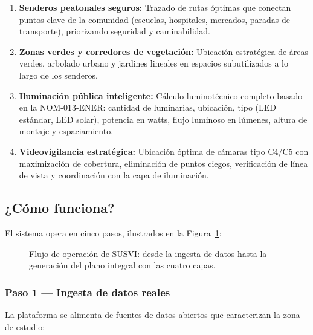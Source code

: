 \documentclass[12pt,a4paper]{article}
\begin{document}
\begin{enumerate}[label=\textbf{\arabic*.}]
    \item \textbf{Senderos peatonales seguros:} Trazado de rutas óptimas que conectan puntos clave de la comunidad (escuelas, hospitales, mercados, paradas de transporte), priorizando seguridad y caminabilidad.
    
    \item \textbf{Zonas verdes y corredores de vegetación:} Ubicación estratégica de áreas verdes, arbolado urbano y jardines lineales en espacios subutilizados a lo largo de los senderos.
    
    \item \textbf{Iluminación pública inteligente:} Cálculo luminotécnico completo basado en la NOM-013-ENER: cantidad de luminarias, ubicación, tipo (LED estándar, LED solar), potencia en watts, flujo luminoso en lúmenes, altura de montaje y espaciamiento.
    
    \item \textbf{Videovigilancia estratégica:} Ubicación óptima de cámaras tipo C4/C5 con maximización de cobertura, eliminación de puntos ciegos, verificación de línea de vista y coordinación con la capa de iluminación.
\end{enumerate}


\subsection{¿Cómo funciona?}

El sistema opera en cinco pasos, ilustrados en la Figura~\ref{fig:flujo}:

\begin{figure}[H]
\centering

\caption{Flujo de operación de SUSVI: desde la ingesta de datos hasta la generación del plano integral con las cuatro capas.}
\label{fig:flujo}
\end{figure}
\subsubsection{Paso 1 — Ingesta de datos reales}

La plataforma se alimenta de fuentes de datos abiertos que caracterizan la zona de estudio:
\end{document}
